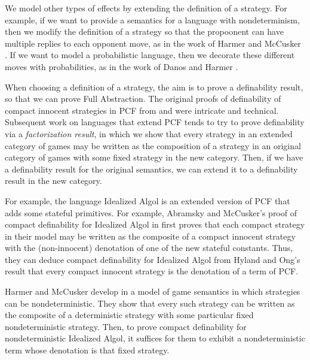 \documentclass[11pt]{report}
\begin{document}
We model other types of effects by extending the definition of a strategy.  
For example, if we want to provide a semantics for a language with nondeterminism, then we modify the definition of a strategy so that the propoonent can have multiple replies to each opponent move, as in the work of Harmer and McCusker \cite{mcCHFiniteND}.
If we want to model a probabilistic language, then we decorate these different moves with probabilities, as in the work of Danos and Harmer \cite{DanosHarmer}.

When choosing a definition of a strategy, the aim is to prove a definability result, so that we can prove Full Abstraction.  
The original proofs of definability of compact innocent strategies in PCF from \cite{ajmPcf} and \cite{hoPcf} were intricate and technical.  
Subsequent work on languages that extend PCF tends to try to prove definability via a \emph{factorization result}, in which we show that every strategy in an extended category of games may be written as the composition of a strategy in an original category of games with some fixed strategy in the new category.  
Then, if we have a definability result for the original semantics, we can extend it to a definability result in the new category.

For example, the language Idealized Algol is an extended version of PCF that adds some stateful primitives.
For example, Abramsky and McCusker's proof of compact definability for Idealized Algol in \cite{SamsonGuyIAActive} first proves that each compact strategy in their model may be written as the composite of a compact innocent strategy with the (non-innocent) denotation of one of the new stateful constants.  
Thus, they can deduce compact definability for Idealized Algol from Hyland and Ong's result that every compact innocent strategy is the denotation of a term of PCF.  

Harmer and McCusker develop in \cite{mcCHFiniteND} a model of game semantics in which strategies can be nondeterministic.  
They show that every such strategy can be written as the composite of a deterministic strategy with some particular fixed nondeterministic strategy.  
Then, to prove compact definability for nondeterministic Idealized Algol, it suffices for them to exhibit a nondeterministic term whose denotation is that fixed strategy.
\end{document}
